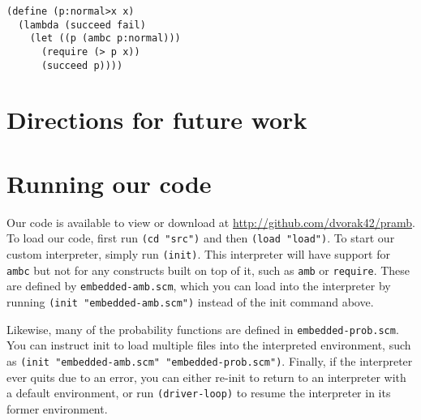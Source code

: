 \documentclass{article}
\begin{document}
\begin{lstlisting}
(define (p:normal>x x)
  (lambda (succeed fail)
    (let ((p (ambc p:normal)))
      (require (> p x))
      (succeed p))))
\end{lstlisting}

\section{Directions for future work}

\appendix

\section{Running our code}

Our code is available to view or download at
\url{http://github.com/dvorak42/pramb}. To load our code, first run \texttt{(cd
"src")} and then \texttt{(load "load")}. To start our custom interpreter,
simply run \texttt{(init)}. This interpreter will have support for
\texttt{ambc} but not for any constructs built on top of it, such as
\texttt{amb} or \texttt{require}. These are defined by
\texttt{embedded-amb.scm}, which you can load into the interpreter by running
\texttt{(init "embedded-amb.scm")} instead of the init command above.

Likewise, many of the probability functions are defined in
\texttt{embedded-prob.scm}. You can instruct init to load multiple files into
the interpreted environment, such as \texttt{(init "embedded-amb.scm"
"embedded-prob.scm")}. Finally, if the interpreter ever quits due to an error,
you can either re-init to return to an interpreter with a default environment,
or run \texttt{(driver-loop)} to resume the interpreter in its former
environment.
\end{document}
